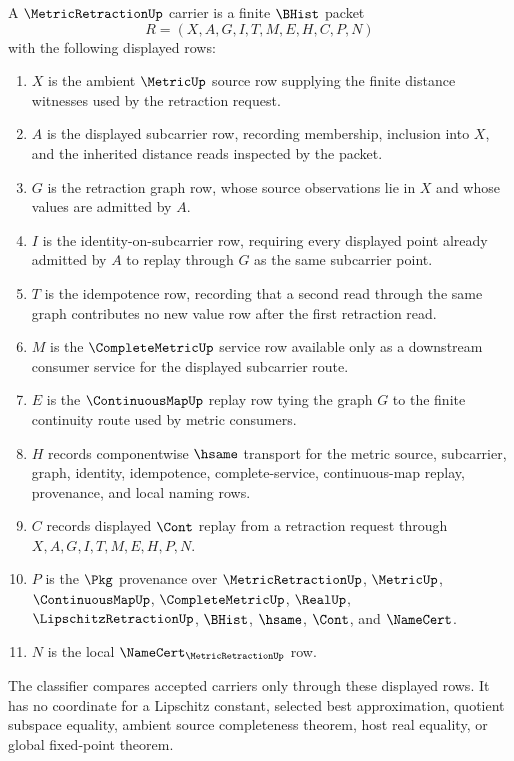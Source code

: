 \begin{definition}
\label{def:metric-retraction-carrier}
A $\MetricRetractionUp$ carrier is a finite $\BHist$ packet
$$
R=(X,A,G,I,T,M,E,H,C,P,N)
$$
with the following displayed rows:
\begin{enumerate}
\item $X$ is the ambient $\MetricUp$ source row supplying the finite distance witnesses used by the retraction request.
\item $A$ is the displayed subcarrier row, recording membership, inclusion into $X$, and the inherited distance reads inspected by the packet.
\item $G$ is the retraction graph row, whose source observations lie in $X$ and whose values are admitted by $A$.
\item $I$ is the identity-on-subcarrier row, requiring every displayed point already admitted by $A$ to replay through $G$ as the same subcarrier point.
\item $T$ is the idempotence row, recording that a second read through the same graph contributes no new value row after the first retraction read.
\item $M$ is the $\CompleteMetricUp$ service row available only as a downstream consumer service for the displayed subcarrier route.
\item $E$ is the $\ContinuousMapUp$ replay row tying the graph $G$ to the finite continuity route used by metric consumers.
\item $H$ records componentwise $\hsame$ transport for the metric source, subcarrier, graph, identity, idempotence, complete-service, continuous-map replay, provenance, and local naming rows.
\item $C$ records displayed $\Cont$ replay from a retraction request through $X,A,G,I,T,M,E,H,P,N$.
\item $P$ is the $\Pkg$ provenance over $\MetricRetractionUp$, $\MetricUp$, $\ContinuousMapUp$, $\CompleteMetricUp$, $\RealUp$, $\LipschitzRetractionUp$, $\BHist$, $\hsame$, $\Cont$, and $\NameCert$.
\item $N$ is the local $\NameCert_{\MetricRetractionUp}$ row.
\end{enumerate}
The classifier compares accepted carriers only through these displayed rows. It has no coordinate for a Lipschitz constant, selected best approximation, quotient subspace equality, ambient source completeness theorem, host real equality, or global fixed-point theorem.
\end{definition}

